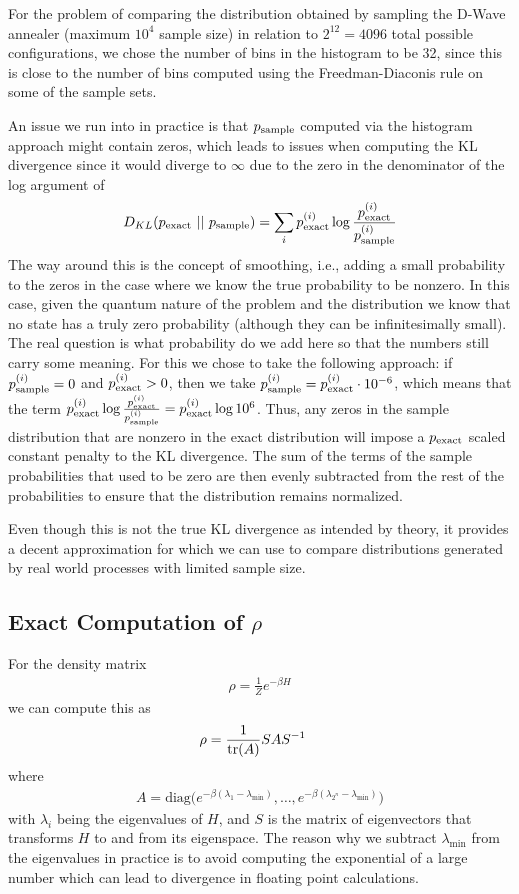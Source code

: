 For the problem of comparing the distribution obtained by sampling the D-Wave annealer (maximum \( 10^4 \) sample size) in relation to \( 2^{12} = 4096 \) total possible configurations, we chose the number of bins in the histogram to be 32, since this is close to the number of bins computed using the Freedman-Diaconis rule on some of the sample sets.

An issue we run into in practice is that \( p_{\text{sample}} \) computed via the histogram approach might contain zeros, which leads to issues when computing the KL divergence since it would diverge to \( \infty \) due to the zero in the denominator of the log argument of
\begin{align}
    D_{KL}(p_{\text{exact}} \ || \ p_{\text{sample}}) = \sum_i p_{\text{exact}}^{(i)} \log\frac{p_{\text{exact}}^{(i)}}{p_{\text{sample}}^{(i)}}
\end{align}
The way around this is the concept of smoothing, i.e., adding a small probability to the zeros in the case where we know the true probability to be nonzero.
In this case, given the quantum nature of the problem and the distribution we know that no state has a truly zero probability (although they can be infinitesimally small).
The real question is what probability do we add here so that the numbers still carry some meaning.
For this we chose to take the following approach: if \( p_{\text{sample}}^{(i)} = 0 \) and \( p_{\text{exact}}^{(i)} > 0 \), then we take \( p_{\text{sample}}^{(i)} = p_{\text{exact}}^{(i)} \cdot 10^{-6} \), which means that the term \( p_{\text{exact}}^{(i)} \log \frac{p_{\text{exact}}^{(i)}}{p_{\text{sample}}^{(i)}} = p_{\text{exact}}^{(i)} \log 10^6 \).
Thus, any zeros in the sample distribution that are nonzero in the exact distribution will impose a \( p_{\text{exact}} \) scaled constant penalty to the KL divergence.
The sum of the terms of the sample probabilities that used to be zero are then evenly subtracted from the rest of the probabilities to ensure that the distribution remains normalized.

Even though this is not the true KL divergence as intended by theory, it provides a decent approximation for which we can use to compare distributions generated by real world processes with limited sample size.

\subsection{Exact Computation of \( \rho \)}\label{app:exact_rho_computation}
For the density matrix
\begin{align}
    \rho = \frac{1}{Z} e^{-\beta H}
\end{align}
we can compute this as
\begin{align}
    \rho
        &= \frac{1}{\text{tr}(A)} S A S^{-1}
\end{align}
where
\begin{align}
    A = \text{diag}\Big(e^{-\beta(\lambda_1 - \lambda_{\min})}, \dots, e^{-\beta(\lambda_{2^n} - \lambda_{\min})}\Big)
\end{align}
with \( \lambda_i \) being the eigenvalues of \( H \), and \( S \) is the matrix of eigenvectors that transforms \( H \) to and from its eigenspace.
The reason why we subtract \( \lambda_{\min} \) from the eigenvalues in practice is to avoid computing the exponential of a large number which can lead to divergence in floating point calculations.

